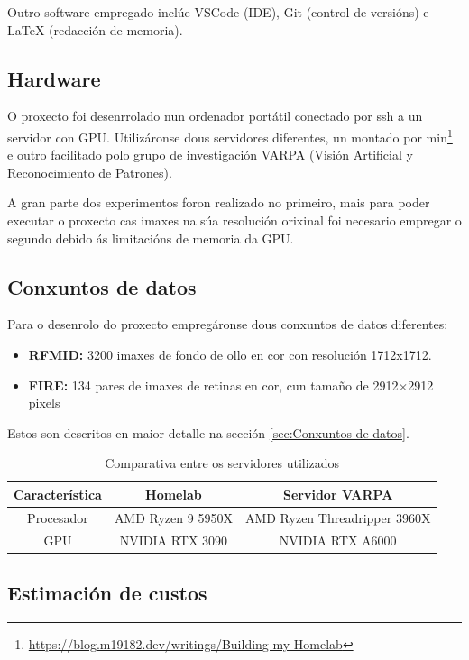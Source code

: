 Outro software empregado inclúe VSCode (IDE), Git (control de versións) e LaTeX (redacción de memoria).

\subsection{Hardware}
\label{subsec:Hardware}

O proxecto foi desenrrolado nun ordenador portátil conectado por ssh a un servidor con GPU. 
Utilizáronse dous servidores diferentes, un montado por min\footnote{\url{https://blog.m19182.dev/writings/Building-my-Homelab}} e outro facilitado polo grupo de investigación VARPA (Visión Artificial y Reconocimiento de Patrones).

A gran parte dos experimentos foron realizado no primeiro, mais para poder executar o proxecto cas imaxes na súa resolución orixinal foi necesario empregar o segundo 
debido ás limitacións de memoria da GPU. 

\subsection{Conxuntos de datos}
\label{subsec:Conxuntos de datos}
Para o desenrolo do proxecto empregáronse dous conxuntos de datos diferentes:

\begin{itemize}
    \item \textbf{RFMID:} 3200 imaxes de fondo de ollo en cor con resolución 1712x1712.
    \item \textbf{FIRE:} 134 pares de imaxes de retinas en cor, cun tamaño de 2912×2912 pixels
\end{itemize}

Estos son descritos en maior detalle na sección \ref{sec:Conxuntos de datos}.

\begin{table}[h]
\centering
\begin{tabular}{|c|c|c|}
\hline
\textbf{Característica} & \textbf{Homelab} & \textbf{Servidor VARPA} \\ \hline
Procesador & AMD Ryzen 9 5950X&  AMD Ryzen Threadripper 3960X \\ \hline
GPU & NVIDIA RTX 3090 & NVIDIA RTX A6000  \\ \hline
\end{tabular}
\caption{Comparativa entre os servidores utilizados}
\label{tab:comparativa_servidores}
\end{table}


\subsection{Estimación de custos}
\label{subsec:Estimación de custos}

